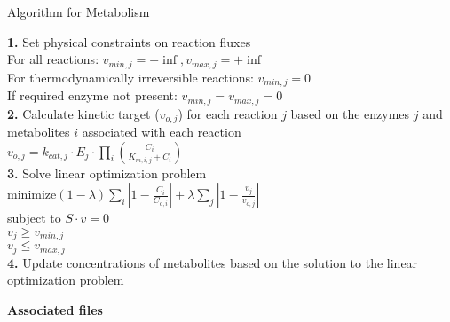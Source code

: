 \documentclass[12pt]{article}
\begin{document}
 \begin{algorithm}[H]
\caption{Algorithm for Metabolism}
\label{metabolism_algorithm}
\textbf{1.} Set physical constraints on reaction fluxes\\
\-\hspace{1 cm}For all reactions: $v_{min,j} = -\inf, v_{max,j} = +\inf$\\
\-\hspace{1 cm}For thermodynamically irreversible reactions: $v_{min,j} = 0$\\
\-\hspace{1 cm}If required enzyme not present: $v_{min,j} = v_{max,j} = 0$\\
\textbf{2.} Calculate kinetic target ($v_{o,j}$) for each reaction $j$ based on the enzymes $j$ and metabolites $i$ associated with each reaction\\
\-\hspace{1 cm} $v_{o,j}=k_{cat,j} \cdot E_j \cdot \prod\limits_i ( \frac{C_i}{K_{m,i,j} + C_i} )$\\
\textbf{3.} Solve linear optimization problem\\
\-\hspace{1 cm} $\mathrm{minimize} (1-\lambda)\sum\limits_i \left| 1-\frac{C_i}{C_{o,i}} \right| + \lambda \sum\limits_j \left| 1-\frac{v_j}{v_{o,j}} \right|$\\
\-\hspace{1 cm} subject to \hspace{0.5 cm}$S\cdot v = 0$\\
\-\hspace{3.2 cm} $v_j \geq v_{min,j}$\\
\-\hspace{3.2 cm} $v_j \leq v_{max,j}$\\
\textbf{4.} Update concentrations of metabolites based on the solution to the linear optimization problem\\
 \end{algorithm}

\newpage
\textbf{Associated files}
\end{document}
